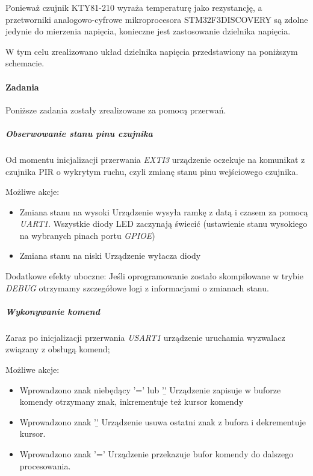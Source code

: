 \documentclass{article}
\begin{document}
Ponieważ czujnik KTY81-210 wyraża temperaturę jako rezystancję, a przetworniki analogowo-cyfrowe
mikroprocesora STM32F3DISCOVERY są zdolne jedynie do mierzenia napięcia, konieczne jest
zastosowanie dzielnika napięcia.

W tym celu zrealizowano układ dzielnika napięcia przedstawiony na poniższym schemacie.

\paragraph{Zadania}
Poniższe zadania zostały zrealizowane za pomocą przerwań.

\subparagraph{Obserwowanie stanu pinu czujnika}
Od momentu inicjalizacji przerwania \emph{EXTI3} urządzenie oczekuje na
komunikat z czujnika PIR o wykrytym ruchu, czyli zmianę stanu pinu wejściowego
czujnika.

Możliwe akcje:
\begin{itemize}
    \item Zmiana stanu na wysoki\newline
    Urządzenie wysyła ramkę z datą i czasem za pomocą \emph{UART1}. Wszystkie diody LED
    zaczynają świecić (ustawienie stanu wysokiego na wybranych pinach portu \emph{GPIOE})

    \item Zmiana stanu na niski\newline
    Urządzenie wyłacza diody
\end{itemize}

Dodatkowe efekty uboczne:
Jeśli oprogramowanie zostało skompilowane w trybie \emph{DEBUG} otrzymamy szczegółowe
logi z informacjami o zmianach stanu.

\subparagraph{Wykonywanie komend}
Zaraz po inicjalizacji przerwania \emph{USART1} urządzenie uruchamia wyzwalacz związany
z obsługą komend;

Możliwe akcje:
\begin{itemize}
   \item Wprowadzono znak niebędący '=' lub '\b'\newline
   Urządzenie zapisuje w buforze komendy otrzymany znak, inkrementuje też
   kursor komendy
   \item Wprowadzono znak '\b'\newline
   Urządzenie usuwa ostatni znak z bufora i dekrementuje kursor.
   \item Wprowadzono znak '='\newline
   Urządzenie przekazuje bufor komendy do dalszego procesowania.
\end{itemize}
\end{document}
